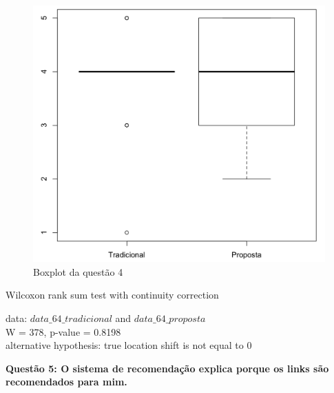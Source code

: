 \begin{figure}[htb]
  \caption{\label{fig:questao4-boxplot}Boxplot da questão 4}
  \begin{center}
      \includegraphics[scale=0.6]{./Figuras/questao4-boxplot.png}
  \end{center}
\end{figure}

Wilcoxon rank sum test with continuity correction

data:  $data\_64\_tradicional$ and $data\_64\_proposta$\\
W = 378, p-value = 0.8198\\
alternative hypothesis: true location shift is not equal to 0

\newpage
\textbf{Questão 5: O sistema de recomendação explica porque os links são recomendados para mim.}


